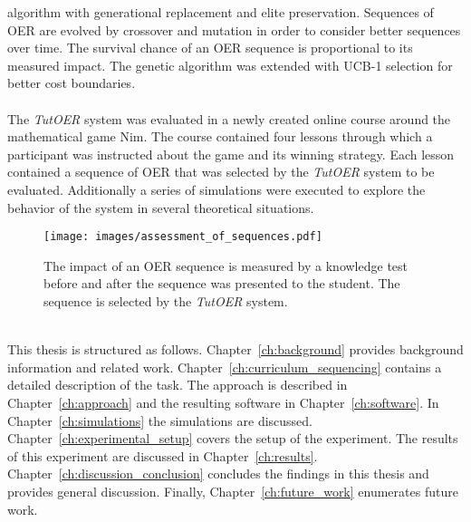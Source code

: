 algorithm with generational replacement and elite preservation. Sequences of
OER are evolved by crossover and mutation in order to consider better sequences
over time. The survival chance of an OER sequence is proportional to its
measured impact. The genetic algorithm was extended with UCB-1 selection
\citep{Auer2002} for better cost boundaries.\\\\
\noindent
The \emph{TutOER} system was evaluated in a newly created online course around
the mathematical game Nim. The course contained four lessons through which a
participant was instructed about the game and its winning strategy. Each lesson
contained a sequence of OER that was selected by the \emph{TutOER} system to be
evaluated. Additionally a series of simulations were executed to explore
the behavior of the system in several theoretical situations.\\
\begin{figure}[h!]
	\begin{framed}
	\centering
	\texttt{[image: images/assessment\_of\_sequences.pdf]}
	\caption[Setup of assessments of impact OER]{The impact of an OER sequence
		is measured by a knowledge test before and after the
	sequence was presented to the student. The sequence is selected by the
	\emph{TutOER} system.}
	\label{fig:assessment_of_sequences}
	\end{framed}
\end{figure}\\
\noindent
This thesis is structured as follows. Chapter~\ref{ch:background} provides
background information and related work. Chapter~\ref{ch:curriculum_sequencing}
contains a detailed description of the task. The approach is described in
Chapter~\ref{ch:approach} and the resulting software in
Chapter~\ref{ch:software}. In Chapter~\ref{ch:simulations} the simulations are
discussed. Chapter~\ref{ch:experimental_setup} covers the setup
of the experiment. The results of this experiment are discussed in
Chapter~\ref{ch:results}. Chapter~\ref{ch:discussion_conclusion} concludes the
findings in this thesis and provides general discussion. Finally,
Chapter~\ref{ch:future_work} enumerates future work.
